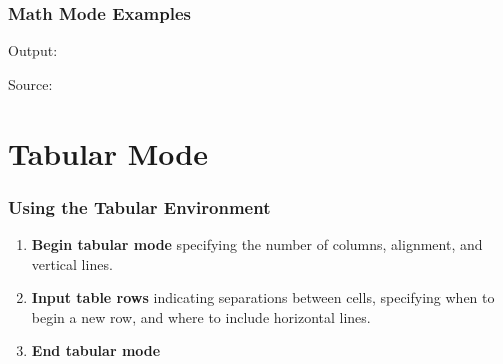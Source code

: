 \documentclass{beamer}
\begin{document}
\begin{frame} \frametitle{Math Mode Examples}
    Output:

    Source:
    
    
\end{frame}


\section{Tabular Mode}

\begin{frame} \frametitle{Using the Tabular Environment}
    \begin{enumerate}
        \item \textbf{Begin tabular mode} specifying the number of columns, alignment, and vertical lines.
        \item \textbf{Input table rows} indicating separations between cells, specifying when to begin a new row, and where to include horizontal lines.
        \item \textbf{End tabular mode}
    \end{enumerate}
\end{frame}
\end{document}
